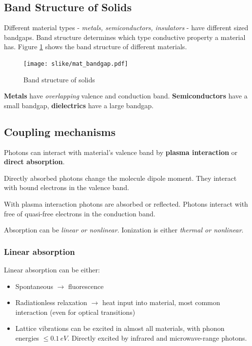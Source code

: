 \subsection{Band Structure of Solids}
Different material types - \textit{metals, semiconductors, insulators} - have different sized bandgaps. 
Band structure determines which type conductive property a material has.  Figure \ref{fig:bandsolids} shows the band 
structure of different materials.

\begin{figure}[h!]
    \centering
    \texttt{[image: slike/mat\_bandgap.pdf]}
    \caption{Band structure of solids}
    \label{fig:bandsolids}
\end{figure}

\textbf{Metals} have \textit{overlapping }  valence and conduction band. 
\textbf{Semiconductors} have a small bandgap, \textbf{dielectrics} have a large bandgap.

\subsection{Coupling mechanisms}
Photons can interact with material's valence band by \textbf{plasma interaction} or \textbf{direct absorption}.

Directly absorbed photons change the molecule dipole moment. They interact with bound electrons  in the valence band.

With plasma interaction photons are absorbed or reflected. Photons interact with 
free of quasi-free electrons in the conduction band.

Absorption can be \textit{linear or nonlinear}. Ionization is either \textit{thermal or nonlinear}.

\subsubsection{Linear absorption}
Linear absorption  can be either:
\begin{itemize}
    \item Spontaneous $\rightarrow$ fluorescence
    \item Radiationless relaxation  $\rightarrow$ heat input into material, most common interaction (even for optical transitions)
    \item Lattice vibrations \pd can be excited in almost all materials, with phonon energies $\le 0.1 \, eV$. Directly excited by infrared and microwave-range photons.
\end{itemize}

